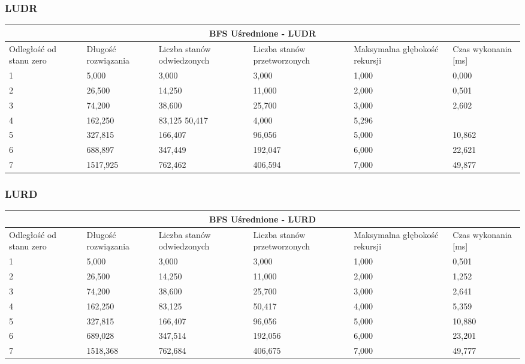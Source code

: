 \documentclass{classrep}
\begin{document}
{\subsubsection{LUDR}
\begin{center}
	\begin{tabular}{ | p{1.6cm} | p{1.4cm} | p{1.8cm} | p{2cm} | p{2.2cm} | p{2cm} | }
	\hline
	\multicolumn{6}{|c|}{BFS Uśrednione - LUDR} \\
	\hline
	Odległość od stanu zero & Długość rozwiązania & Liczba stanów odwiedzonych & Liczba stanów przetworzonych & Maksymalna głębokość rekursji & Czas wykonania [ms]\\
	\hline
	1&5,000&3,000&3,000&1,000&0,000 \\
	\hline
	2&26,500&14,250&11,000&2,000&0,501 \\
	\hline
	3&74,200&38,600&25,700&3,000&2,602 \\
	\hline
	4&162,250&83,125	50,417&4,000&5,296 \\
	\hline
	5&327,815&166,407&96,056&5,000&10,862 \\
	\hline
	6&688,897&347,449&192,047&6,000&22,621 \\
	\hline
	7&1517,925&762,462&406,594&7,000&49,877 \\
	\hline
	\end{tabular}
\end{center}

\subsubsection{LURD}
\begin{center}
	\begin{tabular}{ | p{1.6cm} | p{1.4cm} | p{1.8cm} | p{2cm} | p{2.2cm} | p{2cm} | }
	\hline
	\multicolumn{6}{|c|}{BFS Uśrednione - LURD} \\
	\hline
	Odległość od stanu zero & Długość rozwiązania & Liczba stanów odwiedzonych & Liczba stanów przetworzonych & Maksymalna głębokość rekursji & Czas wykonania [ms]\\
	\hline
	1&5,000&3,000&3,000&1,000&0,501 \\
	\hline
	2&26,500&14,250&11,000&2,000&1,252 \\
	\hline
	3&74,200&38,600&25,700&3,000&2,641\\
	\hline
	4&162,250&83,125	&50,417&4,000&5,359\\
	\hline
	5&327,815&166,407&96,056&5,000&10,880\\
	\hline
	6&689,028&347,514&192,056&6,000&23,201\\
	\hline
	7&1518,368&762,684&406,675&7,000&49,777\\
	\hline
	\end{tabular}
\end{center}

}
\end{document}
